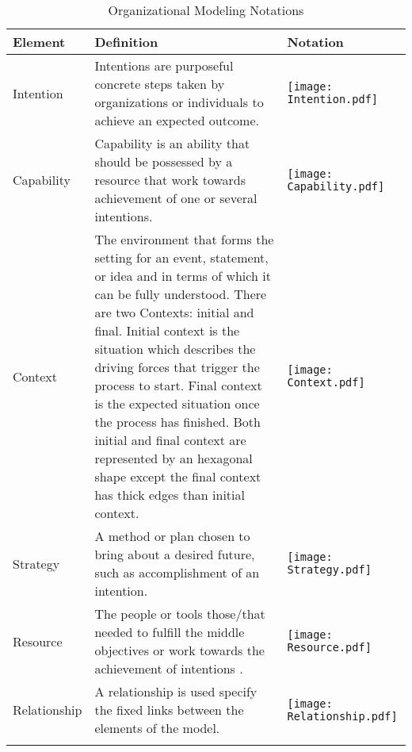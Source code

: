 \begin{center}
	\begin{longtable}{p{3cm}p{10cm}p{3cm}}
		\toprule 
		\textbf{Element} & \textbf{Definition} & \textbf{Notation} \\
		\midrule
		\endfirsthead
		Intention 			& Intentions are purposeful concrete steps taken by organizations or individuals to achieve an expected outcome. & \begin{center} \texttt{[image: Intention.pdf]}  \end{center}  \\
		
		Capability	&  Capability is an ability that should be possessed by a resource that work towards achievement of one or several intentions.   & \begin{center} \texttt{[image: Capability.pdf]} \end{center}  \\
		
		Context				& The environment that forms the setting for an event, statement, or idea and in terms of which it can be fully understood. There are two Contexts: initial and final. Initial context is the situation which describes the driving forces that trigger the process to start. Final context is the expected situation once the process has finished. Both initial and final context are represented by an hexagonal shape except the final context has thick edges than initial context.  & \begin{center} \texttt{[image: Context.pdf]} \end{center}   \\
		\newline
		Strategy		& \newline  A method or plan chosen to bring about a desired future, such as accomplishment of an intention.   & \begin{center} \texttt{[image: Strategy.pdf]} \end{center}  \\
		
		Resource					& The people or tools those/that needed to fulfill the middle objectives or work towards the achievement of intentions . & \begin{center} \texttt{[image: Resource.pdf]} \end{center}  \\
		
		Relationship				& A relationship is used specify the fixed links between the elements of the model.  & \begin{center} \texttt{[image: Relationship.pdf]} \end{center}   \\
		
		\bottomrule
		\caption{Organizational Modeling Notations}
		\label{tab:notations}		
	\end{longtable}	
\end{center}


